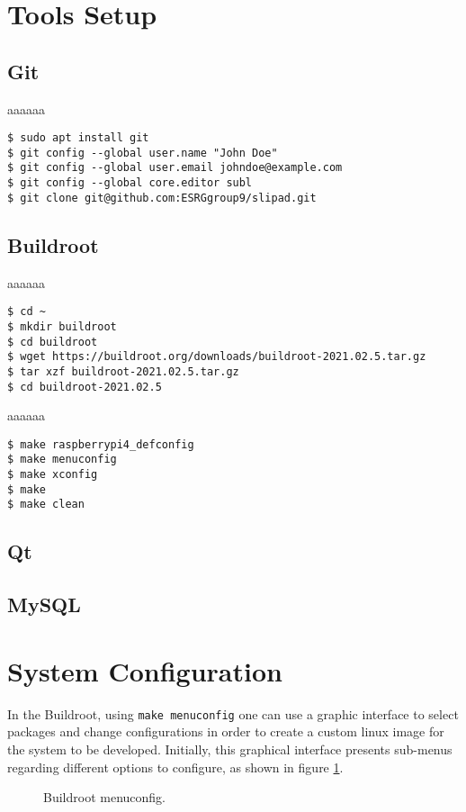 \section{Tools Setup}

\subsection{Git}
aaaaaa
\begin{lstlisting}
$ sudo apt install git
$ git config --global user.name "John Doe"
$ git config --global user.email johndoe@example.com
$ git config --global core.editor subl
$ git clone git@github.com:ESRGgroup9/slipad.git
\end{lstlisting}

\subsection{Buildroot}
aaaaaa
\begin{lstlisting}
$ cd ~
$ mkdir buildroot
$ cd buildroot
$ wget https://buildroot.org/downloads/buildroot-2021.02.5.tar.gz
$ tar xzf buildroot-2021.02.5.tar.gz
$ cd buildroot-2021.02.5
\end{lstlisting}

aaaaaa 
\begin{lstlisting}
$ make raspberrypi4_defconfig
$ make menuconfig
$ make xconfig
$ make 
$ make clean
\end{lstlisting}

\subsection{Qt}

\subsection{MySQL}

\section{System Configuration}
In the Buildroot, using \verb|make menuconfig| one can use a graphic interface to select packages and change configurations in order to create a custom linux image for the system to be developed. Initially, this graphical interface presents sub-menus regarding different options to configure, as shown in figure \ref{fig:menuconfig}.

\begin{figure}[H]
	\centering	
	\caption{Buildroot menuconfig.}
	\label{fig:menuconfig}
\end{figure}

